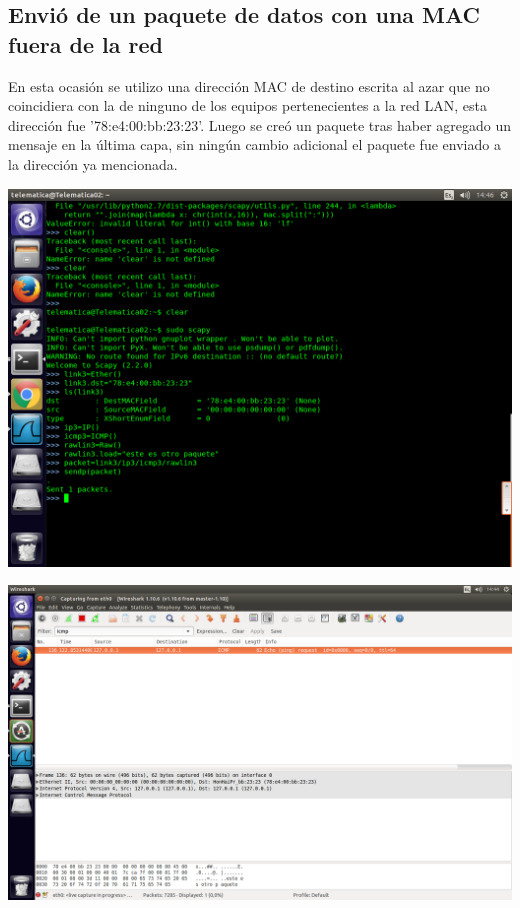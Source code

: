 \documentclass[spanish]{udpreport}
\begin{document}
\subsection{Envió de un paquete de datos con una MAC fuera de la red}

En esta ocasión se utilizo una dirección MAC de destino escrita al azar que no coincidiera con la de ninguno de los equipos pertenecientes a la red LAN, esta dirección fue ’78:e4:00:bb:23:23’. Luego se creó un paquete tras haber agregado un mensaje en la última capa, sin ningún cambio adicional el paquete fue enviado a la dirección ya mencionada.


\begin{center}
	\includegraphics[scale=.37]{imagenes/Switch/Test_3.png}
\end{center}



\begin{center}
	\includegraphics[scale=.37]{imagenes/Switch/Test_3_Wireshark.png}
\end{center}
\end{document}

